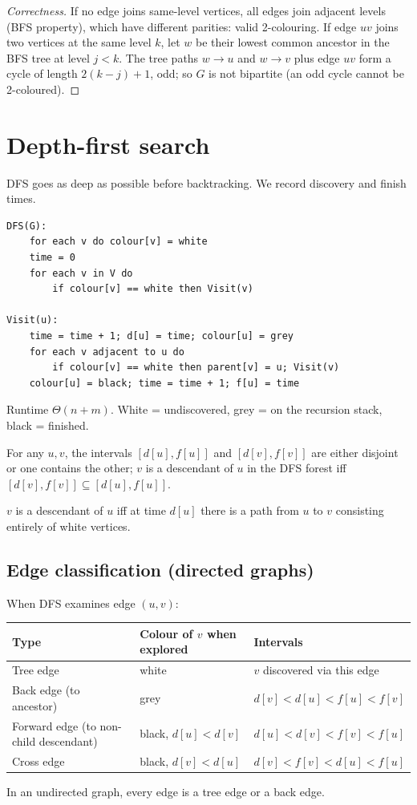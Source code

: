 \begin{proof}[Correctness]
If no edge joins same-level vertices, all edges join adjacent levels (BFS property), which have different parities: valid 2-colouring.
If edge $uv$ joins two vertices at the same level $k$, let $w$ be their lowest common ancestor in the BFS tree at level $j<k$.
The tree paths $w\to u$ and $w\to v$ plus edge $uv$ form a cycle of length $2(k-j)+1$, odd; so $G$ is not bipartite (an odd cycle
cannot be 2-coloured).
\end{proof}

\section{Depth-first search}
DFS goes as deep as possible before backtracking. We record discovery and finish times.
\begin{lstlisting}[style=pseudo]
DFS(G):
    for each v do colour[v] = white
    time = 0
    for each v in V do
        if colour[v] == white then Visit(v)

Visit(u):
    time = time + 1; d[u] = time; colour[u] = grey
    for each v adjacent to u do
        if colour[v] == white then parent[v] = u; Visit(v)
    colour[u] = black; time = time + 1; f[u] = time
\end{lstlisting}
Runtime $\Theta(n+m)$. White = undiscovered, grey = on the recursion stack, black = finished.

\begin{theorem}
For any $u,v$, the intervals $[d[u],f[u]]$ and $[d[v],f[v]]$ are either disjoint or one contains the other; $v$ is a descendant of $u$
in the DFS forest iff $[d[v],f[v]]\subseteq[d[u],f[u]]$.
\end{theorem}
\begin{theorem}
$v$ is a descendant of $u$ iff at time $d[u]$ there is a path from $u$ to $v$ consisting entirely of white vertices.
\end{theorem}

\subsection{Edge classification (directed graphs)}
When DFS examines edge $(u,v)$:
\begin{center}
\small
\begin{tabular}{lll}
\toprule
Type & Colour of $v$ when explored & Intervals \\
\midrule
Tree edge & white & $v$ discovered via this edge \\
Back edge (to ancestor) & grey & $d[v]<d[u]<f[u]<f[v]$ \\
Forward edge (to non-child descendant) & black, $d[u]<d[v]$ & $d[u]<d[v]<f[v]<f[u]$ \\
Cross edge & black, $d[v]<d[u]$ & $d[v]<f[v]<d[u]<f[u]$ \\
\bottomrule
\end{tabular}
\end{center}
In an undirected graph, every edge is a tree edge or a back edge.

